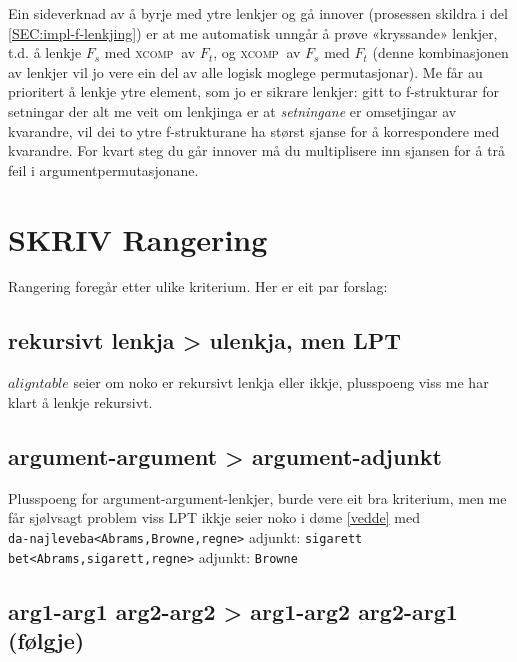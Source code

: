 \documentclass[11pt,a4paper,oneside,draft]{book}
\newcommand{\F}[2]{\textsc{#1}\ensuremath{_{#2}}}
\newcommand{\XCOMPs}{\F{xcomp~}{}}
\begin{document}
Ein sideverknad av å byrje med ytre lenkjer og gå innover (prosessen
skildra i del \ref{SEC:impl-f-lenkjing}) er at me automatisk unngår å
prøve «kryssande» lenkjer, t.d. å lenkje $F_s$ med \XCOMPs av $F_t$, og
\XCOMPs av $F_s$ med $F_t$ (denne kombinasjonen av lenkjer vil jo vere
ein del av alle logisk moglege permutasjonar). Me får au prioritert å
lenkje ytre element, som jo er sikrare lenkjer: gitt to f-strukturar
for setningar der alt me veit om lenkjinga er at \emph{setningane} er
omsetjingar av kvarandre, vil dei to ytre f-strukturane ha størst
sjanse for å korrespondere med kvarandre. For kvart steg du går
innover må du multiplisere inn sjansen for å trå feil i
argumentpermutasjonane.

\section{\textbf{SKRIV} Rangering}
\label{sec-4.2}

\label{SEC:f-rangering}

Rangering foregår etter ulike kriterium. Her er eit par forslag:
\subsection{rekursivt lenkja > ulenkja, men LPT}
\label{sec-4.2.1}

    $aligntable$ seier om noko er rekursivt lenkja eller ikkje,
    plusspoeng viss me har klart å lenkje rekursivt.
\subsection{argument-argument > argument-adjunkt}
\label{sec-4.2.2}

    Plusspoeng for argument-argument-lenkjer, burde vere eit bra
    kriterium, men me får sjølvsagt problem viss LPT ikkje seier noko
    i døme \ref{vedde} med \\
    \texttt{da-najleveba<Abrams,Browne,regne>} adjunkt: \texttt{sigarett}\\
    \texttt{bet<Abrams,sigarett,regne>} adjunkt: \texttt{Browne}
    
\subsection{arg1-arg1 arg2-arg2 > arg1-arg2 arg2-arg1 (følgje)}
\label{sec-4.2.3}
\end{document}
